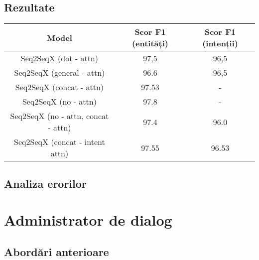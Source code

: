 \subsection{Rezultate}
\begin{center}
	\begin{tabular}{ c c c } 
		\hline
		\textbf{Model} 		 & \textbf{Scor F1 (entități)} & \textbf{Scor F1 (intenții)}\\
		\hline
		Seq2SeqX (dot - attn) & 97,5 & 96,5 \\
		\hline
		Seq2SeqX (general - attn) & 96.6 & 96,5 \\
		\hline
		Seq2SeqX (concat - attn) & 97.53 & - \\
		\hline
		Seq2SeqX (no - attn) & 97.8 & - \\
		\hline
		Seq2SeqX (no - attn, concat - attn) & 97.4 & 96.0 \\
		\hline
		Seq2SeqX (concat - intent attn) & 97.55 & 96.53 \\
		\hline
	\end{tabular}
\end{center}

\subsection{Analiza erorilor}




\section{Administrator de dialog}

\subsection{Abordări anterioare}